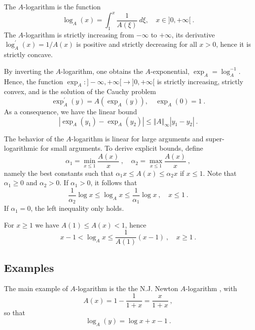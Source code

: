 \documentclass[graybox]{svmult}
\begin{document}
The $A$-logarithm is the function 
\begin{equation*}
\log _{A}(x)=\int_{1}^{x}\frac{1}{A(\xi )}\ d\xi ,\quad x\in ]0,+\infty
\lbrack \ .
\end{equation*}
The $A$-logarithm is strictly increasing from $-\infty $ to $+\infty $, its
derivative $\log _{A}^{\prime }(x)=1/A(x)$ is positive and strictly
decreasing for all $x>0$, hence it is strictly concave.

By inverting the $A$-logarithm, one obtains the $A$-exponential, $\exp
_{A}=\log _{A}^{-1}$. Hence, the function $\exp _{A}\colon ]-\infty ,+\infty
\lbrack \rightarrow ]0,+\infty \lbrack $ is strictly increasing, strictly
convex, and is the solution of the Cauchy problem 
\begin{equation}\label{Aexp}
\exp _{A}^{\prime }(y)=A(\exp _{A}(y)),\quad \exp _{A}(0)=1\ .
\end{equation}
As a consequence, we have the linear bound 
\begin{equation}\label{eq:lip}
\left\vert \exp _{A}(y_{1})-\exp _{A}(y_{2})\right\vert \leq \left\Vert
A\right\Vert _{\infty }\left\vert y_{1}-y_{2}\right\vert \ .
\end{equation}

The behavior of the $A$-logarithm is linear for large arguments and super-logarithmic for small arguments. To derive explicit bounds, define
\begin{equation*}
\alpha_1 = \min_{x\le 1} \frac{A(x)}x \ , \quad \alpha_2 = \max_{x \le 1} \frac{A(x)}x \ ,
\end{equation*}
namely the best constants such that $\alpha_1 x \le A(x) \le \alpha_2 x$ if $x \le 1$. Note that $\alpha_1 \geq 0$ and $\alpha_2 > 0$. If $\alpha_1 > 0$, it follows that
\begin{equation}\label{eq:bound1}
  \frac1{\alpha_2} \log x \le \log_A x \le  \frac1{\alpha_1} \log x \ , \quad x \le 1 \ .
\end{equation}
If $\alpha_1=0$, the left inequality only holds.

For $x \ge 1$ we have $A(1) \leq A(x) < 1$, hence
\begin{equation}\label{eq:bound2}
 x-1 < \log_A x \leq \frac1{A(1)}(x-1) \ , \quad x \ge 1 \ .
\end{equation}

\subsection{Examples}
\label{sec:examples}
The main example of $A$-logarithm is the the N.J. Newton $A$-logarithm 
\cite{newton:2012}, with 
\begin{equation*}
A(x)=1-\frac1{1+x}=\frac{x}{1+x} \ ,
\end{equation*}
so that 
\begin{equation*}
\log_A(y) = \log x + x - 1\ .
\end{equation*}
\end{document}
